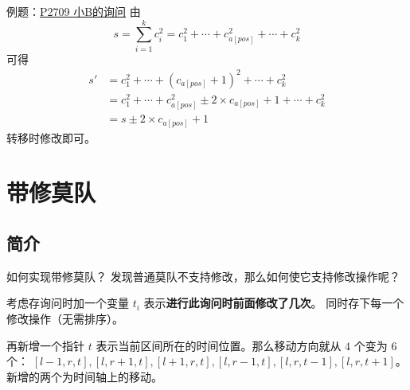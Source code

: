 \documentclass[table]{beamer}
\begin{document}
\begin{frame}
{例题：{\color{blue}\href{https://www.luogu.com.cn/problem/P2709}{P2709 小B的询问}}}
	由
	$$
	s=\sum\limits_{i=1}^k c_i^2=c_1^2+\cdots+c_{a[pos]}^2+\cdots+c_k^2
	$$
	可得
	$$
	\begin{aligned}
		s'&=c_1^2+\cdots+(c_{a[pos]}+1)^2+\cdots+c_k^2\\
		&=c_1^2+\cdots+c_{a[pos]}^2\pm2\times c_{a[pos]}+1+\cdots+c_k^2\\
		&=s\pm2\times c_{a[pos]}+1
	\end{aligned}
	$$
	转移时修改即可。
\end{frame}

\section{带修莫队}

\subsection{简介}
\begin{frame}{如何实现带修莫队？}
	发现普通莫队不支持修改，那么如何使它支持修改操作呢？

	考虑存询问时加一个变量 $t_i$ 表示\textbf{进行此询问时前面修改了几次}。
	同时存下每一个修改操作（无需排序）。

	再新增一个指针 $t$ 表示当前区间所在的时间位置。那么移动方向就从 $4$ 个变为 $6$ 个：
	$[l-1,r,t],[l,r+1,t],[l+1,r,t],[l,r-1,t],[l,r,t-1],[l,r,t+1]$。新增的两个为时间轴上的移动。
\end{frame}
\end{document}
